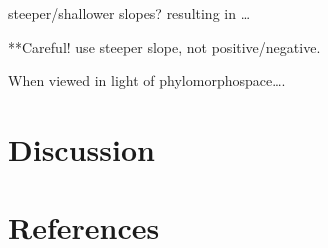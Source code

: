 \documentclass[
]{article}
\begin{document}
steeper/shallower slopes? resulting in \ldots{}

**Careful! use steeper slope, not positive/negative.

When viewed in light of phylomorphospace\ldots.

\hypertarget{discussion}{%
\section{Discussion}\label{discussion}}

\newpage

\hypertarget{references}{%
\section*{References}\label{references}}

\setlength{\parindent}{-0.25in} \setlength{\leftskip}{0.25in}
\setlength{\parskip}{8pt} \noindent
\end{document}
